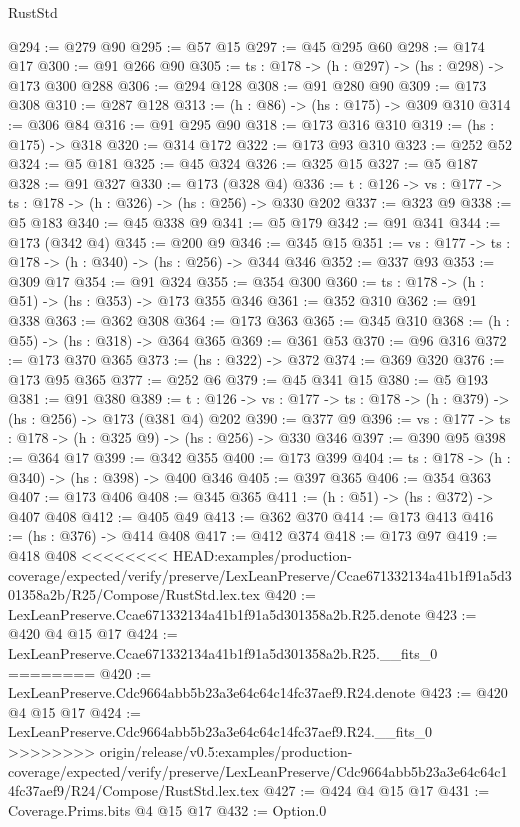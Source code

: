 \begin{lexlean}{RustStd}
\begin{coremodule}
{\begin{coremodule}
@294 := @279 @90
@295 := @57 @15
@297 := @45 @295 @60
@298 := @174 @17
@300 := @91 @266 @90
@305 := {ts : @178} -> (h : @297) -> (hs : @298) -> @173 @300 @288
@306 := @294 @128
@308 := @91 @280 @90
@309 := @173 @308
@310 := @287 @128
@313 := (h : @86) -> (hs : @175) -> @309 @310
@314 := @306 @84
@316 := @91 @295 @90
@318 := @173 @316 @310
@319 := (hs : @175) -> @318
@320 := @314 @172
@322 := @173 @93 @310
@323 := @252 @52
@324 := @5 @181
@325 := @45 @324
@326 := @325 @15
@327 := @5 @187
@328 := @91 @327
@330 := @173 (@328 @4)
@336 := {t : @126} -> {vs : @177} -> {ts : @178} -> (h : @326) -> (hs : @256) -> @330 @202
@337 := @323 @9
@338 := @5 @183
@340 := @45 @338 @9
@341 := @5 @179
@342 := @91 @341
@344 := @173 (@342 @4)
@345 := @200 @9
@346 := @345 @15
@351 := {vs : @177} -> {ts : @178} -> (h : @340) -> (hs : @256) -> @344 @346
@352 := @337 @93
@353 := @309 @17
@354 := @91 @324
@355 := @354 @300
@360 := {ts : @178} -> (h : @51) -> (hs : @353) -> @173 @355 @346
@361 := @352 @310
@362 := @91 @338
@363 := @362 @308
@364 := @173 @363
@365 := @345 @310
@368 := (h : @55) -> (hs : @318) -> @364 @365
@369 := @361 @53
@370 := @96 @316
@372 := @173 @370 @365
@373 := (hs : @322) -> @372
@374 := @369 @320
@376 := @173 @95 @365
@377 := @252 @6
@379 := @45 @341 @15
@380 := @5 @193
@381 := @91 @380
@389 := {t : @126} -> {vs : @177} -> {ts : @178} -> (h : @379) -> (hs : @256) -> @173 (@381 @4) @202
@390 := @377 @9
@396 := {vs : @177} -> {ts : @178} -> (h : @325 @9) -> (hs : @256) -> @330 @346
@397 := @390 @95
@398 := @364 @17
@399 := @342 @355
@400 := @173 @399
@404 := {ts : @178} -> (h : @340) -> (hs : @398) -> @400 @346
@405 := @397 @365
@406 := @354 @363
@407 := @173 @406
@408 := @345 @365
@411 := (h : @51) -> (hs : @372) -> @407 @408
@412 := @405 @49
@413 := @362 @370
@414 := @173 @413
@416 := (hs : @376) -> @414 @408
@417 := @412 @374
@418 := @173 @97
@419 := @418 @408
<<<<<<<< HEAD:examples/production-coverage/expected/verify/preserve/LexLeanPreserve/Ccae671332134a41b1f91a5d301358a2b/R25/Compose/RustStd.lex.tex
@420 := LexLeanPreserve.Ccae671332134a41b1f91a5d301358a2b.R25.denote
@423 := @420 @4 @15 @17
@424 := LexLeanPreserve.Ccae671332134a41b1f91a5d301358a2b.R25.__fits_0
========
@420 := LexLeanPreserve.Cdc9664abb5b23a3e64c64c14fc37aef9.R24.denote
@423 := @420 @4 @15 @17
@424 := LexLeanPreserve.Cdc9664abb5b23a3e64c64c14fc37aef9.R24.__fits_0
>>>>>>>> origin/release/v0.5:examples/production-coverage/expected/verify/preserve/LexLeanPreserve/Cdc9664abb5b23a3e64c64c14fc37aef9/R24/Compose/RustStd.lex.tex
@427 := @424 @4 @15 @17
@431 := Coverage.Prims.bits @4 @15 @17
@432 := Option.{0}

\end{coremodule}}
\end{coremodule}
\end{lexlean}
